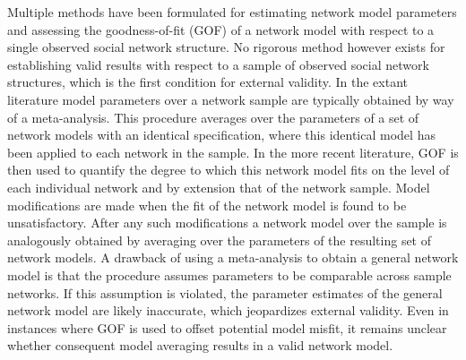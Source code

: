 \documentclass[a4paper, man]{apa6}
\begin{document}
Multiple methods have been formulated for estimating network model parameters and assessing the goodness-of-fit (GOF) of a network model with respect to a single observed social network structure. No rigorous method however exists for establishing valid results with respect to a sample of observed social network structures, which is the first condition for external validity. In the extant literature model parameters over a network sample are typically obtained by way of a meta-analysis. This procedure averages over the parameters of a set of network models with an identical specification, where this identical model has been applied to each network in the sample. In the more recent literature, GOF is then used to quantify the degree to which this network model fits on the level of each individual network and by extension that of the network sample. \clearpage \noindent Model modifications are made when the fit of the network model is found to be unsatisfactory. After any such modifications a network model over the sample is analogously obtained by averaging over the parameters of the resulting  set of network models. A drawback of using a meta-analysis to obtain a general network model is that the procedure assumes parameters to be comparable across sample networks. If this assumption is violated, the parameter estimates of the general network model are likely inaccurate, which jeopardizes external validity. Even in instances where GOF is used to offset potential model misfit, it remains unclear whether consequent model averaging results in a valid network model. 
\\
\end{document}
